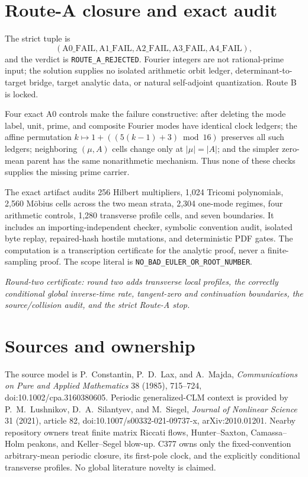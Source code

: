 \documentclass[10pt]{article}
\begin{document}
\section{Route-A closure and exact audit}

The strict tuple is
\[
 (\mathrm{A0\_FAIL},\mathrm{A1\_FAIL},\mathrm{A2\_FAIL},
  \mathrm{A3\_FAIL},\mathrm{A4\_FAIL}),
\]
and the verdict is \texttt{ROUTE\_A\_REJECTED}.  Fourier integers are not
rational-prime input; the solution supplies no isolated arithmetic orbit
ledger, determinant-to-target bridge, target analytic data, or natural
self-adjoint quantization.  Route B is locked.

Four exact A0 controls make the failure constructive: after deleting the
mode label, unit, prime, and composite Fourier modes have identical clock
ledgers; the affine permutation
$k\mapsto1+((5(k-1)+3)\bmod16)$ preserves all such ledgers; neighboring
$(\mu,A)$ cells change only at $|\mu|=|A|$; and the simpler zero-mean parent
has the same nonarithmetic mechanism.  Thus none of these checks supplies
the missing prime carrier.

The exact artifact audits 256 Hilbert multipliers, 1,024 Tricomi
polynomials, 2,560 M\"obius cells across the two mean strata, 2,304 one-mode
regimes, four arithmetic controls, 1,280 transverse profile cells, and seven boundaries.  It includes
an importing-independent checker, symbolic convention audit, isolated byte
replay, repaired-hash hostile mutations, and deterministic PDF gates.  The
computation is a transcription certificate for the analytic proof, never a
finite-sampling proof.  The scope literal is
\texttt{NO\_BAD\_EULER\_OR\_ROOT\_NUMBER}.

\noindent\textit{Round-two certificate: round two adds transverse local
profiles, the correctly conditional global inverse-time rate, tangent-zero
and continuation boundaries, the source/collision audit, and the strict
Route-A stop.}

\section*{Sources and ownership}
The source model is P.~Constantin, P.~D.~Lax, and A.~Majda,
\emph{Communications on Pure and Applied Mathematics} 38 (1985), 715--724,
doi:10.1002/cpa.3160380605.  Periodic generalized-CLM context is provided by
P.~M.~Lushnikov, D.~A.~Silantyev, and M.~Siegel, \emph{Journal of Nonlinear
Science} 31 (2021), article 82, doi:10.1007/s00332-021-09737-x,
arXiv:2010.01201.  Nearby repository owners treat finite matrix Riccati
flows, Hunter--Saxton, Camassa--Holm peakons, and Keller--Segel blow-up.
C377 owns only the fixed-convention arbitrary-mean periodic closure, its
first-pole clock, and the explicitly conditional transverse profiles.  No
global literature novelty is claimed.
\fi
\end{document}
